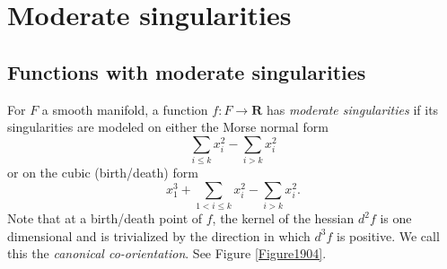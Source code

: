 \documentclass{amsart}
\def\bR{\mathbf{R}}
\theoremstyle{definition}
\theoremstyle{remark}
\newtheorem{inductive lemma}[theorem]{Inductive Lemma}
\begin{document}

\appendix


\section{Moderate singularities}\label{sec: moderate singularities}

\subsection{Functions with moderate singularities}

For $F$ a smooth manifold, a function $f:F \to \bR$ has {\em moderate singularities} if its singularities are modeled on either the Morse normal form $$\sum_{i\leq k}x_i^2-\sum_{i>k}x_i^2$$ or on the cubic (birth/death) form $$x_1^3+\sum_{1<i\leq k}x_i^2-\sum_{i>k}x_i^2.$$ 
Note that at a birth/death point of $f$, the kernel of the hessian $d^2f$ is one dimensional and is trivialized by the direction in which $d^3f$ is positive. We call this the {\em canonical co-orientation}. See Figure \ref{Figure1904}.
\end{document}
